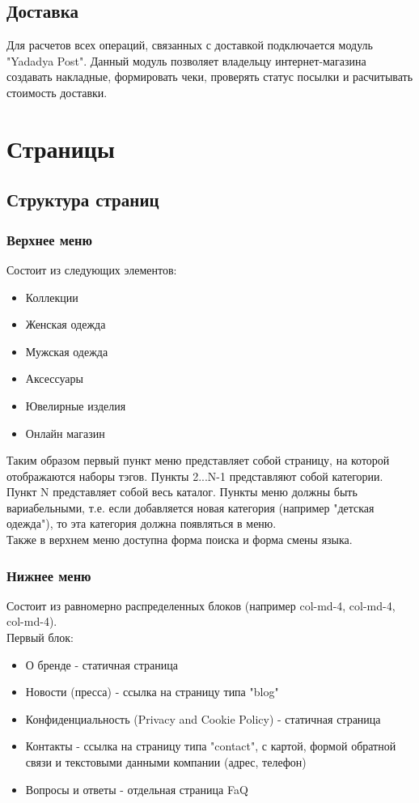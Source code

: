 \documentclass[DIV=calc, paper=a4, fontsize=11pt]{scrartcl} %
\begin{document}
\subsection{Доставка}\label{subsec:delivery}
Для расчетов всех операций, связанных с доставкой подключается модуль "Yadadya Post". Данный модуль позволяет владельцу интернет-магазина создавать накладные, формировать чеки, проверять статус посылки и расчитывать стоимость доставки.

\section{Страницы}

\subsection{Структура страниц}

\subsubsection{Верхнее меню}


Состоит из следующих элементов:
\begin{itemize}
	\item Коллекции
	\item Женская одежда
	\item Мужская одежда
	\item Аксессуары
	\item Ювелирные изделия 
	\item Онлайн магазин
\end{itemize}

Таким образом первый пункт меню представляет собой страницу, на которой отображаются наборы тэгов. Пункты 2...N-1 представляют собой категории. Пункт N представляет собой весь каталог. Пункты меню должны быть вариабельными, т.е. если добавляется новая категория (например "детская одежда"), то эта категория должна появляться в меню.
\\[0.5cm]
Также в верхнем меню доступна форма поиска и форма смены языка.

\subsubsection{Нижнее меню}
Состоит из равномерно распределенных блоков (например col-md-4, col-md-4, col-md-4). 
\\[0.5cm]
Первый блок:
\begin{itemize}
	\item О бренде - статичная страница
	\item Новости (пресса) - ссылка на страницу типа "blog"
	\item Конфиденциальность (Privacy and Cookie Policy) - статичная страница
	\item Контакты - ссылка на страницу типа "contact", с картой, формой обратной связи и текстовыми данными компании (адрес, телефон)
	\item Вопросы и ответы - отдельная страница FaQ
\end{itemize}
\end{document}
